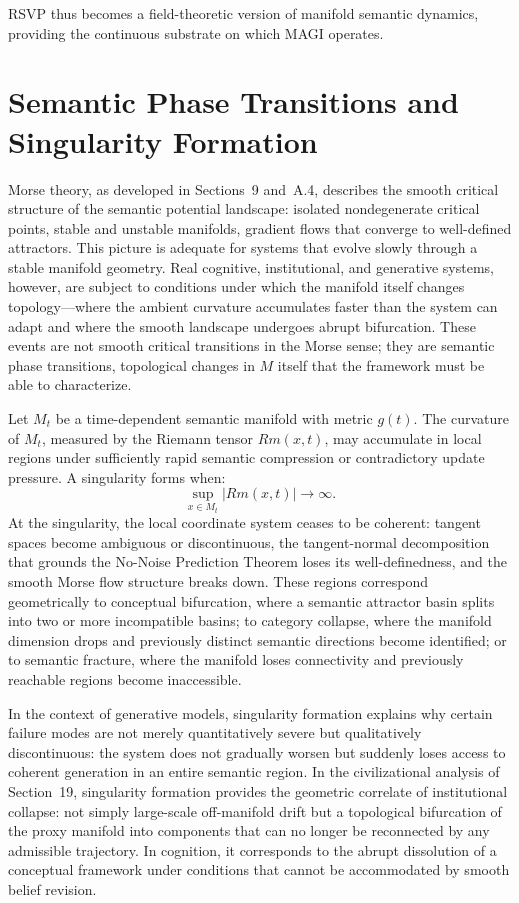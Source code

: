 \documentclass[11pt,a4paper,twocolumn]{article}
\begin{document}
RSVP thus becomes a field-theoretic version of manifold semantic
dynamics, providing the continuous substrate on which MAGI operates.


\section{Semantic Phase Transitions and Singularity Formation}

Morse theory, as developed in Sections~9 and~A.4, describes the smooth
critical structure of the semantic potential landscape: isolated
nondegenerate critical points, stable and unstable manifolds, gradient
flows that converge to well-defined attractors. This picture is
adequate for systems that evolve slowly through a stable manifold
geometry. Real cognitive, institutional, and generative systems,
however, are subject to conditions under which the manifold itself
changes topology---where the ambient curvature accumulates faster than
the system can adapt and where the smooth landscape undergoes abrupt
bifurcation. These events are not smooth critical transitions in the
Morse sense; they are semantic phase transitions, topological changes
in $M$ itself that the framework must be able to characterize.

Let $M_t$ be a time-dependent semantic manifold with metric $g(t)$.
The curvature of $M_t$, measured by the Riemann tensor $Rm(x,t)$,
may accumulate in local regions under sufficiently rapid semantic
compression or contradictory update pressure. A singularity forms
when:
\[
\sup_{x \in M_t} |Rm(x,t)| \to \infty.
\]
At the singularity, the local coordinate system ceases to be coherent:
tangent spaces become ambiguous or discontinuous, the
tangent-normal decomposition that grounds the No-Noise Prediction
Theorem loses its well-definedness, and the smooth Morse flow
structure breaks down. These regions correspond geometrically to
conceptual bifurcation, where a semantic attractor basin splits
into two or more incompatible basins; to category collapse, where
the manifold dimension drops and previously distinct semantic
directions become identified; or to semantic fracture, where the
manifold loses connectivity and previously reachable regions
become inaccessible.

In the context of generative models, singularity formation explains
why certain failure modes are not merely quantitatively severe but
qualitatively discontinuous: the system does not gradually worsen
but suddenly loses access to coherent generation in an entire
semantic region. In the civilizational analysis of Section~19,
singularity formation provides the geometric correlate of
institutional collapse: not simply large-scale off-manifold drift
but a topological bifurcation of the proxy manifold into components
that can no longer be reconnected by any admissible trajectory.
In cognition, it corresponds to the abrupt dissolution of a
conceptual framework under conditions that cannot be accommodated
by smooth belief revision.
\end{document}
